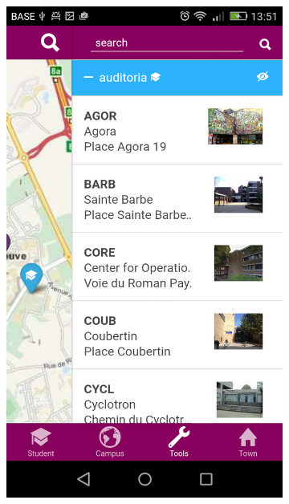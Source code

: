 \documentclass{eplmastersthesis}
\begin{document}
\begin{figure}
\begin{subfigure}[b]{0.3\textwidth}
        \includegraphics[width=\textwidth]{Images/Application_screens/Screenshot_2016-06-06-13-51-29.png}
    \end{subfigure}
    ~ %
    \begin{subfigure}[b]{0.3\textwidth}

\end{subfigure}
\end{figure}
\end{document}
